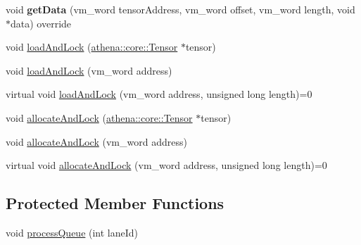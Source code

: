 \begin{DoxyCompactItemize}
void {\bfseries get\+Data} (vm\+\_\+word tensor\+Address, vm\+\_\+word offset, vm\+\_\+word length, void $\ast$data) override
\item 
void \mbox{\hyperlink{classathena_1_1backend_1_1generic_1_1_generic_memory_manager_a2bbfba2a5104aab3068d46214a6ae7df}{load\+And\+Lock}} (\mbox{\hyperlink{classathena_1_1core_1_1_tensor}{athena\+::core\+::\+Tensor}} $\ast$tensor)
\item 
void \mbox{\hyperlink{classathena_1_1backend_1_1generic_1_1_generic_memory_manager_a47ea5a77f81f91f803f748720c5c19b5}{load\+And\+Lock}} (vm\+\_\+word address)
\item 
virtual void \mbox{\hyperlink{classathena_1_1backend_1_1generic_1_1_generic_memory_manager_a9fe52e4020802d6f526fba06adce8407}{load\+And\+Lock}} (vm\+\_\+word address, unsigned long length)=0
\item 
void \mbox{\hyperlink{classathena_1_1backend_1_1generic_1_1_generic_memory_manager_ad40a653a8b32410956ba835ca1bb3e5f}{allocate\+And\+Lock}} (\mbox{\hyperlink{classathena_1_1core_1_1_tensor}{athena\+::core\+::\+Tensor}} $\ast$tensor)
\item 
void \mbox{\hyperlink{classathena_1_1backend_1_1generic_1_1_generic_memory_manager_ab5305b3d1ab91960bf179ce0be166120}{allocate\+And\+Lock}} (vm\+\_\+word address)
\item 
virtual void \mbox{\hyperlink{classathena_1_1backend_1_1generic_1_1_generic_memory_manager_a1b80008e94c21d5ac87f9a45d3f212a8}{allocate\+And\+Lock}} (vm\+\_\+word address, unsigned long length)=0
\end{DoxyCompactItemize}
\subsection*{Protected Member Functions}
\begin{DoxyCompactItemize}
\item 
void \mbox{\hyperlink{classathena_1_1backend_1_1generic_1_1_generic_memory_manager_a978be661a46caaa8f6ef40a2c45a014e}{process\+Queue}} (int lane\+Id)
\end{DoxyCompactItemize}

